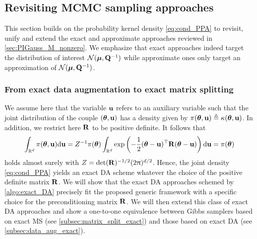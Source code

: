 \documentclass[nohypdvips,onefignum,onetabnum]{siamart171218}
\begin{document}
\subsection{Revisiting MCMC sampling approaches}
\label{subsec:PPA_to_Gibbs}

This section builds on the probability kernel density \cref{eq:cond_PPA} to revisit, unify and extend the exact and approximate approaches reviewed in \cref{sec:PIGauss_M_nonzero}. 
We emphasize that exact approaches indeed target the distribution of interest $\mathcal{N}(\boldsymbol{\mu},\mathbf{Q}^{-1})$ while approximate ones only target an approximation of $\mathcal{N}(\boldsymbol{\mu},\mathbf{Q}^{-1})$.


\subsubsection{From exact data augmentation to exact matrix splitting}
\label{subsubsec:DA_MS}

We assume here that the variable $\mathbf{u}$ refers to an auxiliary variable such that the joint distribution of the couple $(\boldsymbol{\theta},\mathbf{u})$ has a density given by $\pi(\boldsymbol{\theta},\mathbf{u}) \triangleq \kappa(\boldsymbol{\theta},\mathbf{u})$.
In addition, we restrict here $\mathbf{R}$ to be positive definite.
It follows that
\begin{equation}
  \label{eq:exact_DA2}
  \int_{\mathbb{R}^d} \pi(\Bs{\theta},\B{u}) \mathrm{d}\B{u} = Z^{-1}\pi(\Bs{\theta})\int_{\mathbb{R}^d} \exp\pr{-\frac{1}{2}(\Bs{\theta}-\B{u})^{\top}\B{R}(\Bs{\theta}-\B{u})}\mathrm{d}\B{u} = \pi(\Bs{\theta})
\end{equation}
holds almost surely with $Z = \mathrm{det}(\mathbf{R})^{-1/2}(2\uppi)^{d/2}$.
Hence, the joint density \cref{eq:cond_PPA} yields an exact DA scheme whatever the choice of the positive definite matrix $\mathbf{R}$.
We will show that the exact DA approaches schemed by \cref{algo:exact_DA} precisely fit the proposed generic framework with a specific choice for the preconditioning matrix $\mathbf{R}$.
We will then extend this class of exact DA approaches and show a one-to-one equivalence between Gibbs samplers based on exact MS (see \cref{subsec:matrix_split_exact}) and those based on exact DA (see \cref{subsec:data_aug_exact}).
\end{document}
